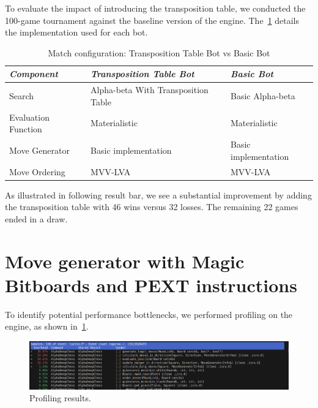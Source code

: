 \noindent To evaluate the impact of introducing the transposition table, we conducted the 100-game tournament against the baseline version of the engine. The~\cref{tab:tt_vs_basic} details the implementation used for each bot.

\vspace{1em}

\begin{table}
    \centering
    \begin{tabular}{|p{4cm}|p{4cm}|p{4cm}|}
    \hline
    \textit{Component}         & \textit{Transposition Table Bot}  & \textit{Basic Bot}     \\ \hline
    Search                     & Alpha-beta With Transposition Table          & Basic Alpha-beta           \\ \hline
    Evaluation Function        & Materialistic                      & Materialistic       \\ \hline
    Move Generator             & Basic implementation              & Basic implementation   \\ \hline
    Move Ordering              & MVV-LVA                           & MVV-LVA                \\ \hline
    \end{tabular}
    \caption{Match configuration: Transposition Table Bot vs Basic Bot}\label{tab:tt_vs_basic}
\end{table}

\noindent As illustrated in following result bar, we see a substantial improvement by adding the transposition table with 46 wins versus 32 losses. The remaining 22 games ended in a draw.

\begin{center}
\medskip
\end{center}

\section{Move generator with Magic Bitboards and PEXT instructions}

To identify potential performance bottlenecks, we performed profiling on the engine, as shown in~\cref{fig:profiling}.

\vspace{1em}

\begin{figure}
    \centering
    \includegraphics[width=1.0\textwidth]{Imagenes/basic_move_generator_profiling.png}
    \caption{Profiling results.}\label{fig:profiling}
\end{figure}

